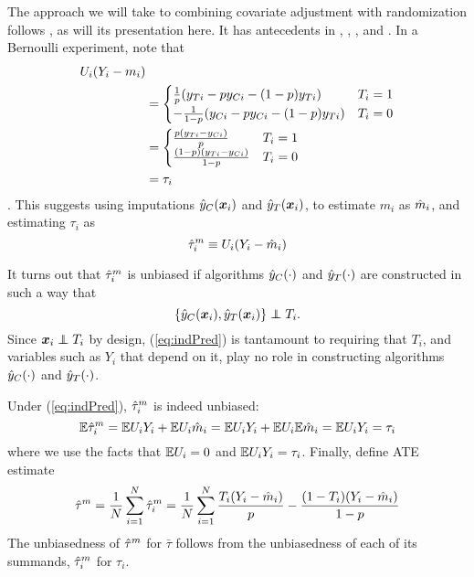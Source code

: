 The approach we will take to combining covariate adjustment with
randomization follows \citet{loop}, as will its presentation here.
It has antecedents in \citet{rosenbaum2002covariance},
\citet{aronowMiddleton}, \citet{wager2016high}, and \citet{tame}.
In a Bernoulli experiment, note that
\begin{align*}
U_i(Y_i-m_i)&\\
&=\begin{cases}
\frac{1}{p}(y_{Ti}-py_{Ci}-(1-p)y_{Ti})&T_i=1\\
-\frac{1}{1-p}(y_{Ci}-py_{Ci}-(1-p)y_{Ti})&T_i=0 \end{cases}\\
&=\begin{cases}
\frac{p(y_{Ti}-y_{Ci})}{p}&T_i=1\\
\frac{(1-p)(y_{Ti}-y_{Ci})}{1-p}&T_i=0
\end{cases}\\
&=\tau_i
\end{align*}.
This suggests using imputations $\hat{y}_C(\bm{x}_i)$ and $\hat{y}_T(\bm{x}_i)$, to estimate $m_i$ as
$\hat{m}_i$,
and estimating $\tau_i$ as
\begin{equation*}
\hat{\tau}_i^m\equiv U_i(Y_i-\hat{m}_i)
\end{equation*}

It turns out that $\hat{\tau}_i^m$ is unbiased if algorithms $\hat{y}_C(\cdot)$ and $\hat{y}_T(\cdot)$
are constructed in such a way that
\begin{equation}\label{eq:indPred}
\{\predcx,\predtx\}\independent T_i.
\end{equation}
Since $\bm{x}_i\independent T_i$ by design, (\ref{eq:indPred}) is
tantamount to requiring that $T_i$, and variables such as $Y_i$ that
depend on it, play no role in constructing algorithms $\hat{y}_C(\cdot)$ and
$\hat{y}_T(\cdot)$.

Under (\ref{eq:indPred}), $\hat{\tau}_i^m$ is indeed unbiased:
\begin{equation}
\mathbb{E} \hat{\tau}_i^m=\mathbb{E} U_iY_i+\mathbb{E} U_i\hat{m}_i=\mathbb{E} U_iY_i+\mathbb{E} U_i\mathbb{E}\hat{m}_i=\mathbb{E}
U_iY_i=\tau_i
\end{equation}
where we use the facts that $\mathbb{E} U_i=0$ and $\mathbb{E} U_iY_i=\tau_i$.
Finally, define ATE estimate
\begin{equation} \label{eq:thm}
\hat{\tau}^m=\frac{1}{N}\displaystyle\sum_{i=1}^N
\hat{\tau}_i^m=\frac{1}{N}\displaystyle\sum_{i=1}^N
\frac{T_i(Y_i-\hat{m}_i)}{p}-\frac{(1-T_i)(Y_i-\hat{m}_i)}{1-p}
\end{equation}
The unbiasedness of $\hat{\tau}^m$ for $\bar{\tau}$ follows from the
unbiasedness of each of its summands, $\hat{\tau}_i^m$ for $\tau_i$.

